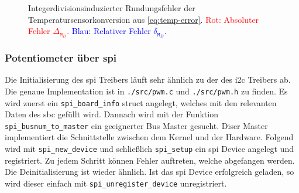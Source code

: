 \begin{figure}[h]
    \centering
    \caption[Integerdivisionsinduzierter Rundungsfehler]{Integerdivisionsinduzierter Rundungsfehler der Temperatursensorkonversion aus \autoref{eq:temp-error}.
    \textcolor{red}{Rot: Absoluter Fehler $\Delta_{\texttt{M}_D}$.}
    \textcolor{blue}{Blau: Relativer Fehler $\delta_{\texttt{M}_D}$.}
    }
    \label{fig:rounding-err}
\end{figure}

\subsubsection{Potentiometer über \acrshort{spi}}

Die Initialisierung des \gls{spi} Treibers läuft sehr ähnlich zu der des \gls{i2c} Treibers ab.
Die genaue Implementation ist in \texttt{./src/pwm.c} und \texttt{./src/pwm.h} zu finden.
Es wird zuerst ein \texttt{spi\_board\_info} struct angelegt, welches mit den relevanten Daten des \gls{sbc} gefüllt wird.
Dannach wird mit der Funktion \texttt{spi\_busnum\_to\_master} ein geeignerter Bus Master gesucht.
Diser Master implementiert die Schnittstelle zwischen dem Kernel und der Hardware.
Folgend wird mit \texttt{spi\_new\_device} und schließlich \texttt{spi\_setup} ein \gls{spi} Device angelegt und registriert.
Zu jedem Schritt können Fehler auftreten, welche abgefangen werden.
Die Deinitialisierung ist wieder ähnlich.
Ist das \gls{spi} Device erfolgreich geladen, so wird dieser einfach mit \texttt{spi\_unregister\_device} unregistriert.

